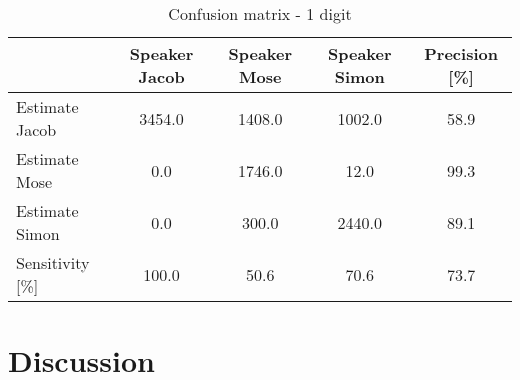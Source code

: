 \begin{table}[H]                                                    
\centering                                                          
\begin{tabular}{|l|c|c|c|c|}                                        
\hline                                                              
  & Speaker Jacob & Speaker Mose & Speaker Simon & Precision [\%] \\
\hline                                                              
Estimate Jacob & 3454.0 & 1408.0 & 1002.0 & 58.9 \\                 
\hline                                                              
Estimate Mose & 0.0 & 1746.0 & 12.0 & 99.3 \\                       
\hline                                                              
Estimate Simon & 0.0 & 300.0 & 2440.0 & 89.1 \\                     
\hline                                                              
Sensitivity [\%] & 100.0 & 50.6 & 70.6 & 73.7 \\                    
\hline                                                              
\end{tabular}                                                       
\caption{Confusion matrix - 1 digit}                                
\label{table:SVM_3_conf_1}                                          
\end{table} 


\section{Discussion}